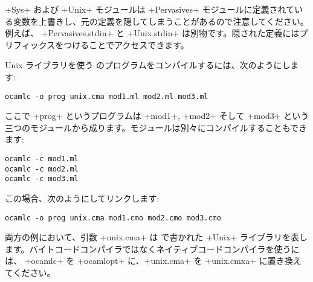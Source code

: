 \ml+Sys+ および \ml+Unix+ モジュールは \ml+Pervasives+ モジュールに定義されている変数を上書きし、元の定義を隠してしまうことがあるので注意してください。例えば、 \ml+Pervasives.stdin+ と \ml+Unix.stdin+ は別物です。隠された定義にはプリフィックスをつけることでアクセスできます。

Unix ライブラリを使う \ocaml のプログラムをコンパイルするには、次のようにします:
%
\begin{lstlisting}
ocamlc -o prog unix.cma mod1.ml mod2.ml mod3.ml
\end{lstlisting}
%
ここで \ml+prog+ というプログラムは \ml+mod1+, \ml+mod2+ そして \ml+mod3+ という三つのモジュールから成ります。モジュールは別々にコンパイルすることもできます:
%
\begin{lstlisting}
ocamlc -c mod1.ml
ocamlc -c mod2.ml
ocamlc -c mod3.ml
\end{lstlisting}
%
この場合、次のようにしてリンクします:
%
\begin{lstlisting}
ocamlc -o prog unix.cma mod1.cmo mod2.cmo mod3.cmo
\end{lstlisting}
%
両方の例において、引数 \ml+unix.cma+ は \ocaml で書かれた \ml+Unix+ ライブラリを表します。バイトコードコンパイラではなくネイティブコードコンパイラを使うには、 \ml+ocamlc+ を \ml+ocamlopt+ に、\ml+unix.cma+ を \ml+unix.cmxa+ に置き換えてください。


